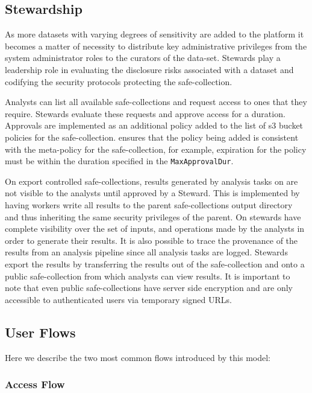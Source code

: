 \subsection{Stewardship}

As more datasets with varying degrees of sensitivity are added to the \NAME platform it becomes a matter
of necessity to distribute key administrative privileges from the system administrator roles to the curators
of the data-set. Stewards play a leadership role in evaluating the disclosure risks associated with a
dataset and codifying the security protocols protecting the safe-collection.

Analysts can list all available safe-collections and request access to ones that they require.
Stewards evaluate these requests and approve access for a duration. Approvals are implemented as an additional
policy added to the list of s3 bucket policies for the safe-collection. \NAME ensures that the policy
being added is consistent with the meta-policy for the safe-collection, for example, expiration for the policy
must be within the duration specified in the \texttt{MaxApprovalDur}.

On export controlled safe-collections, results generated by analysis tasks on \NAME are not visible to the
analysts until approved by a Steward. This is implemented by having workers write all results to the
parent safe-collections output directory and thus inheriting the same security privileges of the parent.
On \NAME stewards have complete visibility over the set of inputs, and operations made by the analysts
in order to generate their results. It is also possible to trace the provenance of the results from an
analysis pipeline since all analysis tasks are logged.
Stewards export the results by transferring the results out of the safe-collection and onto a public
safe-collection from which analysts can view results. It is important to note that even public
safe-collections have server side encryption and are only accessible to authenticated users via temporary
signed URLs.


\subsection{User Flows}

Here we describe the two most common flows introduced by this model:

\subsubsection{Access Flow}

